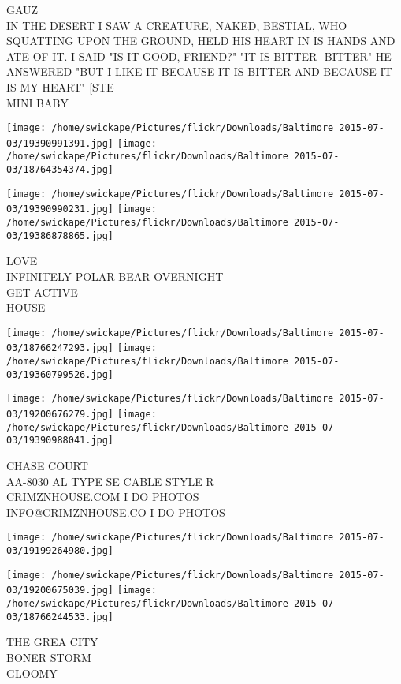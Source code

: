 \documentclass[10pt,letterpaper]{article}
\begin{document}
GAUZ\\
IN THE DESERT I SAW A CREATURE, NAKED, BESTIAL, WHO SQUATTING UPON THE GROUND, HELD HIS HEART IN IS HANDS AND ATE OF IT.  I SAID "IS IT GOOD, FRIEND?"  "IT IS BITTER{-}{-}BITTER" HE ANSWERED "BUT I LIKE IT BECAUSE IT IS BITTER AND BECAUSE IT IS MY HEART" {[}STE\\
MINI BABY\\
\pagebreak

\texttt{[image: /home/swickape/Pictures/flickr/Downloads/Baltimore 2015-07-03/19390991391.jpg]}
\texttt{[image: /home/swickape/Pictures/flickr/Downloads/Baltimore 2015-07-03/18764354374.jpg]}

\texttt{[image: /home/swickape/Pictures/flickr/Downloads/Baltimore 2015-07-03/19390990231.jpg]}
\texttt{[image: /home/swickape/Pictures/flickr/Downloads/Baltimore 2015-07-03/19386878865.jpg]}

LOVE\\
INFINITELY POLAR BEAR OVERNIGHT\\
GET ACTIVE\\
HOUSE\\
\pagebreak

\texttt{[image: /home/swickape/Pictures/flickr/Downloads/Baltimore 2015-07-03/18766247293.jpg]}
\texttt{[image: /home/swickape/Pictures/flickr/Downloads/Baltimore 2015-07-03/19360799526.jpg]}

\texttt{[image: /home/swickape/Pictures/flickr/Downloads/Baltimore 2015-07-03/19200676279.jpg]}
\texttt{[image: /home/swickape/Pictures/flickr/Downloads/Baltimore 2015-07-03/19390988041.jpg]}

CHASE COURT\\
AA{-}8030 AL TYPE SE CABLE STYLE R\\
CRIMZNHOUSE.COM I DO PHOTOS\\
INFO@CRIMZNHOUSE.CO I DO PHOTOS\\
\pagebreak

\texttt{[image: /home/swickape/Pictures/flickr/Downloads/Baltimore 2015-07-03/19199264980.jpg]}

\vspace{0.25in}
\texttt{[image: /home/swickape/Pictures/flickr/Downloads/Baltimore 2015-07-03/19200675039.jpg]}
\texttt{[image: /home/swickape/Pictures/flickr/Downloads/Baltimore 2015-07-03/18766244533.jpg]}

THE GREA CITY\\
BONER STORM\\
GLOOMY\\
\pagebreak
\end{document}
